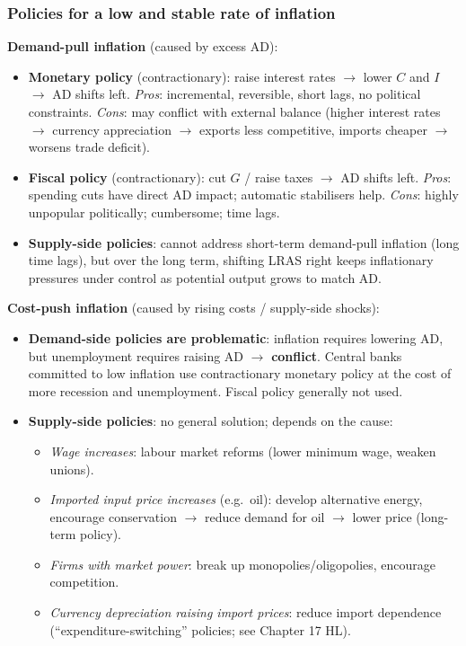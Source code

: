 \subsubsection*{Policies for a low and stable rate of inflation}
\textbf{Demand-pull inflation} (caused by excess AD):
\begin{itemize}
  \item \textbf{Monetary policy} (contractionary): raise interest rates $\to$ lower $C$ and $I$ $\to$ AD shifts left. \textit{Pros}: incremental, reversible, short lags, no political constraints. \textit{Cons}: may conflict with external balance (higher interest rates $\to$ currency appreciation $\to$ exports less competitive, imports cheaper $\to$ worsens trade deficit).
  \item \textbf{Fiscal policy} (contractionary): cut $G$ / raise taxes $\to$ AD shifts left. \textit{Pros}: spending cuts have direct AD impact; automatic stabilisers help. \textit{Cons}: highly unpopular politically; cumbersome; time lags.
  \item \textbf{Supply-side policies}: cannot address short-term demand-pull inflation (long time lags), but over the long term, shifting LRAS right keeps inflationary pressures under control as potential output grows to match AD.
\end{itemize}
\textbf{Cost-push inflation} (caused by rising costs / supply-side shocks):
\begin{itemize}
  \item \textbf{Demand-side policies are problematic}: inflation requires lowering AD, but unemployment requires raising AD $\to$ \textbf{conflict}. Central banks committed to low inflation use contractionary monetary policy at the cost of more recession and unemployment. Fiscal policy generally not used.
  \item \textbf{Supply-side policies}: no general solution; depends on the cause:
  \begin{itemize}
    \item \textit{Wage increases}: labour market reforms (lower minimum wage, weaken unions).
    \item \textit{Imported input price increases} (e.g.\ oil): develop alternative energy, encourage conservation $\to$ reduce demand for oil $\to$ lower price (long-term policy).
    \item \textit{Firms with market power}: break up monopolies/oligopolies, encourage competition.
    \item \textit{Currency depreciation raising import prices}: reduce import dependence (``expenditure-switching'' policies; see Chapter 17 HL).
  \end{itemize}
\end{itemize}

